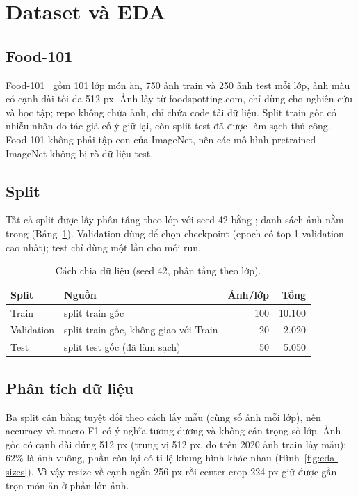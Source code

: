 \documentclass[11pt, a4paper]{article}
\begin{document}
\section{Dataset và EDA}

\subsection{Food-101}
Food-101~\cite{bossard2014food} gồm 101 lớp món ăn, 750 ảnh train và 250 ảnh test mỗi lớp, ảnh màu có cạnh dài tối đa 512 px. Ảnh lấy từ foodspotting.com, chỉ dùng cho nghiên cứu và học tập; repo không chứa ảnh, chỉ chứa code tải dữ liệu. Split train gốc có nhiễu nhãn do tác giả cố ý giữ lại, còn split test đã được làm sạch thủ công. Food-101 không phải tập con của ImageNet, nên các mô hình pretrained ImageNet không bị rò dữ liệu test.

\subsection{Split}

Tất cả split được lấy phân tầng theo lớp với seed 42 bằng ; danh sách ảnh nằm trong  (Bảng~\ref{tab:split}). Validation dùng để chọn checkpoint (epoch có top-1 validation cao nhất); test chỉ dùng một lần cho mỗi run.

\begin{table}[H]
  \centering
  \caption{Cách chia dữ liệu (seed 42, phân tầng theo lớp).}
  \label{tab:split}
  \begin{tabular}{llrr}
    \toprule
    \textbf{Split} & \textbf{Nguồn} & \textbf{Ảnh/lớp} & \textbf{Tổng} \\
    \midrule
    Train      & split train gốc & 100 & 10.100 \\
    Validation & split train gốc, không giao với Train & 20 & 2.020 \\
    Test       & split test gốc (đã làm sạch) & 50 & 5.050 \\
    \bottomrule
  \end{tabular}
\end{table}

\subsection{Phân tích dữ liệu}

Ba split cân bằng tuyệt đối theo cách lấy mẫu (cùng số ảnh mỗi lớp), nên accuracy và macro-F1 có ý nghĩa tương đương và không cần trọng số lớp. Ảnh gốc có cạnh dài đúng 512 px (trung vị 512 px, đo trên 2020 ảnh train lấy mẫu); 62\% là ảnh vuông, phần còn lại có tỉ lệ khung hình khác nhau (Hình~\ref{fig:eda-sizes}). Vì vậy resize về cạnh ngắn 256 px rồi center crop 224 px giữ được gần trọn món ăn ở phần lớn ảnh.
\end{document}
